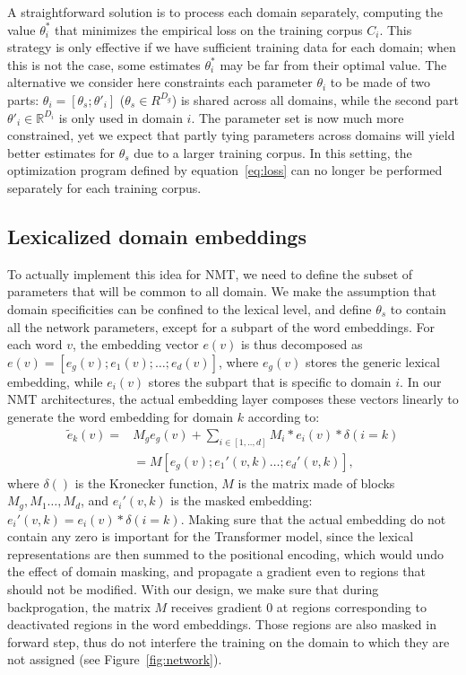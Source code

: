 \documentclass[11pt,a4paper]{article}
\newcommand{\fyDone}[1]{\done[FY]\Todo[FY:]{\textcolor{orange}{#1}}}
\begin{document}
A straightforward solution is to process each domain separately, computing the value $\theta_i^*$ that minimizes the empirical loss on the training corpus $C_i$. This strategy is only effective if we have sufficient training data for each domain; when this is not the case, some estimates $\theta_i^*$ may be far from their optimal value. \fyDone{Risk}
The alternative we consider here constraints each parameter $\theta_i$ to be made of two parts: $\theta_i = [\theta_s; \theta'_i]$ ($\theta_s \in R^{D_g}$) is shared across all domains, while the second part $\theta'_i \in \mathbb{R}^{D_i}$ is only used in domain $i$.
The parameter set is now much more constrained, yet we expect that partly tying parameters across domains will yield better estimates for $\theta_s$ due to a larger training corpus. In this setting, the optimization program defined by equation~\eqref{eq:loss} can no longer be performed separately for each training corpus.

\subsection{Lexicalized domain embeddings \label{ssec:lde}}

To actually implement this idea for NMT, we need to define the subset of parameters that will be common to all domain. We make the assumption that domain specificities can be confined to the lexical level, and define $\theta_s$ to contain all the network parameters, except for a subpart of the word embeddings. For each word $v$, the embedding vector $e(v)$ is thus decomposed as $e(v) = [e_g(v); e_1(v); \dots; e_d(v)]$, where $e_g(v)$ stores the generic lexical embedding, while $e_i(v)$ stores the subpart that is specific to domain $i$.
In our NMT architectures, the actual embedding layer composes these vectors linearly to generate the word embedding for domain $k$ according to:
\begin{align}
  \tilde{e}_k(v) =& M_g e_g(v) + \sum_{i \in [1,..,d]} M_i * e_i(v) * \delta(i=k) \nonumber \\
   & = M [e_g(v); e_1'(v,k) \dots; e_d'(v,k)], \label{eq:embedding}
\end{align}
where $\delta()$ is the Kronecker function, $M$ is the matrix made of blocks $M_g, M_1 \dots, M_d$, and $e_i'(v,k)$ is the masked embedding: $e_i'(v,k)= e_i(v) * \delta(i=k)$.  Making sure that the actual embedding do not contain any zero is important for the Transformer model, since the lexical representations are then summed to the positional encoding, which would undo the effect of domain masking, and propagate a gradient even to regions that should not be modified. With our design, we make sure that during backprogation, the matrix $M$ receives gradient $0$ at regions corresponding to deactivated regions in the word embeddings. Those regions are also masked in forward step, thus do not interfere the training on the domain to which they are not assigned (see Figure~\ref{fig:network}).
\end{document}
